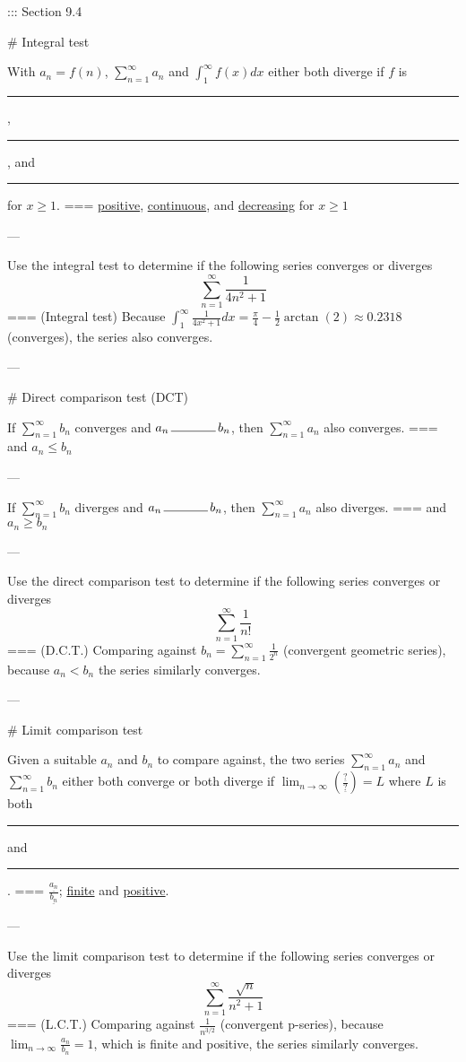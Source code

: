 ::: Section 9.4

# Integral test

With \(a_n=f(n)\), \(\sum_{n=1}^\infty a_n\) and \(\int_1^\infty f(x)dx\)
either both diverge if \(f\) is \rule{1cm}{0.15mm}, \rule{1cm}{0.15mm}, and
\rule{1cm}{0.15mm} for \(x\geq 1\).
===
\underline{positive}, \underline{continuous}, and \underline{decreasing} for
\(x\geq 1\)

---

Use the integral test to determine if the following series converges or diverges
\[\sum_{n=1}^\infty \frac{1}{4n^2+1}\]
===
(Integral test) Because \(\int_1^\infty
\frac{1}{4x^2+1}dx=\frac{\pi}{4}-\frac{1}{2}\arctan(2)\approx 0.2318\)
(converges), the series also converges.

---

# Direct comparison test (DCT)

If \(\sum_{n=1}^\infty b_n\) converges and \(a_n\,\rule{1.25cm}{0.15mm}\,b_n\),
then \(\sum_{n=1}^\infty a_n\) also converges.
===
and \(a_n\leq b_n\)

---

If \(\sum_{n=1}^\infty b_n\) diverges and \(a_n\,\rule{1.25cm}{0.15mm}\,b_n\),
then \(\sum_{n=1}^\infty a_n\) also diverges.
===
and \(a_n\geq b_n\)

---

Use the direct comparison test to determine if the following series converges or
diverges
\[\sum_{n=1}^\infty \frac{1}{n!}\]
===
(D.C.T.) Comparing against \(b_n=\sum_{n=1}^\infty \frac{1}{2^n}\) (convergent
geometric series), because \(a_n<b_n\) the series similarly converges.

---

# Limit comparison test

Given a suitable \(a_n\) and \(b_n\) to compare against, the two series
\(\sum_{n=1}^\infty a_n\) and \(\sum_{n=1}^\infty b_n\) either both converge or
both diverge if
\(\lim_{n\to\infty}\left(\frac{\underline{?}}{\underline{?}}\right)=L\) where
\(L\) is both \rule{1cm}{0.15mm} and \rule{1cm}{0.15mm}.
===
\(\frac{\underline{a_n}}{\underline{b_n}}\); \underline{finite} and
\underline{positive}.

---

Use the limit comparison test to determine if the following series converges or
diverges
\[\sum_{n=1}^\infty \frac{\sqrt{n}}{n^2+1}\]
===
(L.C.T.) Comparing against \(\frac{1}{n^{3/2}}\) (convergent p-series), because
\(\lim_{n\to\infty}\frac{a_n}{b_n}=1\), which is finite and positive, the series
similarly converges.

